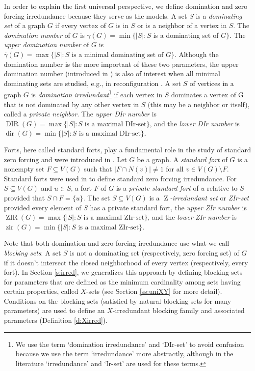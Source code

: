 \documentclass{article}
\numberwithin{figure}{section}
\numberwithin{table}{section}
\numberwithin{equation}{section}
\theoremstyle{definition}
\theoremstyle{definition}
\theoremstyle{definition}
\newcommand{\ol}{\overline}
\newcommand{\Z}{\operatorname{Z}}
\newcommand{\dbar}{\ol\gamma}
\DeclareMathOperator{\dir}{dir}
\DeclareMathOperator{\DIR}{DIR}
\DeclareMathOperator{\zir}{zir}
\DeclareMathOperator{\ZIR}{ZIR}
\begin{document}
 
In order to explain the first universal perspective, we define domination and zero forcing irredundance because they serve as the models.  A set $S$ is a \emph{dominating  set} of a graph $G$ if every vertex of $G$ is in $S$ or is a neighbor of a vertex in $S$.  The \emph{domination number} of  $G$ is $\gamma(G)=\min\{|S|: S$ is a %
dominating set of $G\}$.  The \emph{upper domination number} of  $G$ is $\dbar(G)=\max\{|S|: S\mbox{ is a minimal dominating set of }G\}$.  Although the domination number is the more important of these two parameters, the upper domination number (introduced in \cite{CHM78}) is also of interest when all  minimal dominating sets are studied, e.g., in reconfiguration \cite{HS14}.
A set $S$ of vertices in a graph $G$ is \emph{domination irredundant}\footnote{We use the term `domination irredundance' and `DIr-set' 
to avoid confusion because we use the term `irredundance' more abstractly, although in the literature `irredundance' and `Ir-set' are used for these terms.} if each vertex in $S$ dominates a vertex of G that is not dominated by any other vertex in $S$  (this may be a neighbor or itself), called a \emph{private neighbor}.  
The  \emph{upper DIr number} is $\DIR(G) = \max\{|S|: S \text{ is a maximal DIr-set}\}$, and the \emph{lower DIr number} is $\dir(G) = \min\{|S| : S \text{ is a maximal DIr-set}\}$.


 Forts, here called standard forts, play a fundamental role in the study of standard zero forcing and were introduced in \cite{FH18}.  Let $G$ be a graph. A \emph{standard fort} of $G$ is a nonempty set $F\subseteq V(G)$ such that $|F\cap N(v)|\ne 1$ for all $v\in V(G)\setminus F$.  Standard forts were used in \cite{ZIR} to define standard zero forcing irredundance. 
 For $S\subseteq V(G)$ and $u\in S$, a fort $F$ of $G$ is a \emph{private standard fort} of $u$ relative to $S$ provided that $S\cap F = \{u\}$. The set $S\subseteq V(G)$ is a \emph{$\Z$-irredundant set} or \emph{ZIr-set} provided every element of $S$ has a private standard fort, the  \emph{upper ZIr number} is $\ZIR(G) = \max\{|S|: S \text{ is a maximal ZIr-set}\}$, and the \emph{lower ZIr number} is $\zir(G) = \min\{|S| : S \text{ is a maximal ZIr-set}\}$. 



Note that both domination and zero forcing irredundance use what we call \emph{blocking sets}: A set $S$ is not a dominating  set (respectively, zero forcing set) of $G$ if it doesn't intersect  the closed neighborhood of every  vertex (respectively, every fort).   In Section \ref{s:irred}, we generalizes  this approach by  defining blocking sets  for parameters that are defined as the minimum cardinality among sets having certain properties, called $X$-sets (see Section \ref{ss:uniXY} for more detail).  Conditions on the blocking sets (satisfied by natural blocking sets for many parameters) are used to define an $X$-irredundant blocking family and associated parameters (Definition \ref{d:Xirred}).
\end{document}
